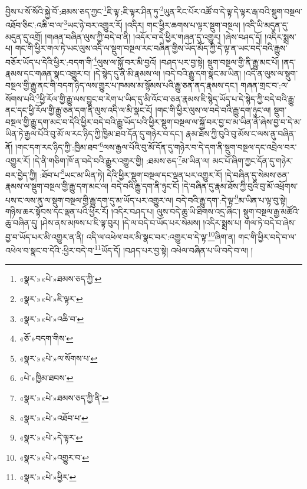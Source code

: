 བྱིས་པ་སོ་སོའི་སྐྱེ་བོ་:ཐམས་ཅད་ཀྱང་\footnote{«སྣར་»«པེ་»ཐམས་ཅད་ཀྱི་}ཇི་ལྟ་:ཇི་ལྟར་ཤིན་ཏུ་\footnote{«སྣར་»«པེ་»ཇི་ལྟར་}ཡུན་རིང་པོར་འཚོ་བ་དེ་ལྟ་དེ་ལྟར་རྒ་བའི་སྡུག་བསྔལ་འཐོབ་ཅིང་:འཆི་བ་ལ་\footnote{«སྣར་»«པེ་»འཆི་བ་}ཡང་ཉེ་བར་འགྱུར་རོ། །འདིར། གང་ཕྱིར་ཆགས་པ་ལྟར་སྡུག་བསྔལ། །འདི་ཡི་མདུན་དུ་མདུན་དུ་འགྲོ། །གཞན་བཞིན་ལུས་ཀྱི་བདེ་བ་ནི། །འདོར་བ་དེ་ཕྱིར་གཞན་དུ་འགྱུར། །ཞེས་བཤད་དོ། །འདིར་སྨྲས་པ། གང་གི་ཕྱིར་གལ་ཏེ་ཡང་ལུས་འདི་ལ་སྡུག་བསྔལ་རང་བཞིན་གྱིས་ཡོད་མོད་ཀྱི་དེ་ལྟ་ན་ཡང་བདེ་བའི་རྒྱུས་བཅོར་ཡོད་པ་དེའི་ཕྱིར་:བདག་གི་\footnote{«ཅོ་»བདག་གིས་}ལུས་ལ་སྐྱོ་བར་མི་བྱའོ། །བཤད་པར་བྱ་སྟེ། སྡུག་བསྔལ་གྱི་ནི་རྒྱུ་མང་པོ། །ནད་རྣམས་དང་གཞན་སྣང་འགྱུར་བ། །དེ་སྙེད་དུ་ནི་མི་རྣམས་ལ། །བདེ་བའི་རྒྱུ་དག་སྣང་མ་ཡིན། །འདི་ན་ལུས་ལ་སྡུག་བསྔལ་གྱི་རྒྱུ་ནང་གི་བདག་ཉིད་ལས་གྱུར་པ་ཁམས་མ་སྙོམས་པའི་རྒྱུ་ཅན་ནད་རྣམས་དང་། གཞན་གྲང་བ་:ལ་སོགས་པའི་\footnote{«སྣར་»«པེ་»ལ་སོགས་པ་}ཕྱི་རོལ་གྱི་རྒྱུ་ལས་བྱུང་བ་རེག་པ་ཡིད་དུ་མི་འོང་བ་ཅན་རྣམས་ཇི་སྙེད་ཡོད་པ་དེ་སྙེད་ཀྱི་བདེ་བའི་རྒྱུ་ནང་དང་ཕྱི་རོལ་གྱི་རྒྱུ་ཅན་དག་ནི་ལུས་འདི་ལ་མི་སྣང་ངོ། །གང་གི་ཕྱིར་ལུས་ལ་བདེ་བའི་རྒྱུ་དག་ཉུང་ལ། སྡུག་བསྔལ་གྱི་རྒྱུ་དག་མང་བ་དེའི་ཕྱིར་བདེ་བའི་རྒྱུ་ཡོད་པའི་ཕྱིར་སྡུག་བསྔལ་ལ་སྐྱོ་བར་བྱ་བ་མ་ཡིན་ནོ་ཞེས་བྱ་བ་དེ་མ་ཡིན་ཏེ་རྒྱལ་པོའི་བུ་མོ་ལ་རང་ཉིད་ཀྱི་ཁྱིམ་ཐབ་དོན་དུ་གཉེར་བ་དང་། རྣམ་ཐོས་ཀྱི་བུའི་བུ་མོས་ང་ལས་ནུ་བཞིན་ནོ། །གང་དག་རང་ཉིད་ཀྱི་:ཁྱིམ་ཐབ་\footnote{«པེ་»ཁྱིམ་ཐབས་}ལས་རྒྱལ་པོའི་བུ་མོ་དོན་དུ་གཉེར་བ་དེ་དག་ནི་སྡུག་བསྔལ་དང་འབྲེལ་བར་འགྱུར་རོ། །དེ་ནི་གཅིག་ཁོ་ན་བདེ་བའི་རྒྱུར་འགྱུར་གྱི། :ཐམས་ཅད་\footnote{«སྣར་»«པེ་»ཐམས་ཅད་ཀྱི་ནི་}མ་ཡིན་ལ། མང་པོ་ཞིག་ཀྱང་དོན་དུ་གཉེར་བར་བྱེད་ཀྱི། :ཐོབ་པ་\footnote{«སྣར་»«པེ་»འཐོབ་པ་}ཡང་མ་ཡིན་ཏེ། དེའི་ཕྱིར་སྡུག་བསྔལ་དང་ལྡན་པར་འགྱུར་རོ། །དེ་བཞིན་དུ་སེམས་ཅན་རྣམས་ལ་སྡུག་བསྔལ་གྱི་རྒྱུ་དག་མང་ལ། བདེ་བའི་རྒྱུ་དག་ནི་ཉུང་ངོ། །དེ་བཞིན་དུ་རྣམ་ཐོས་ཀྱི་བུའི་བུ་མོ་འཕྲོགས་པས་ང་ལས་ནུ་ལ་སྡུག་བསྔལ་གྱི་རྒྱུ་དག་དུ་མ་ཡོད་པར་འགྱུར་ལ། བདེ་བའི་རྒྱུ་དག་:དེ་ལྟ་\footnote{«སྣར་»«པེ་»དེ་ལྟར་}མ་ཡིན་པ་ལྟ་བུ་སྟེ། གཉིས་ཆར་སྟོབས་དང་ལྡན་པའི་ཕྱིར་རོ། །འདིར་བཤད་པ། ལུས་བདེ་ཆུ་ཡི་ཐིགས་འདྲ་ཞིང་། སྡུག་བསྔལ་རྒྱ་མཚོའི་ཆུ་བཞིན་དུ། །ཤེས་ནས་མཁས་པ་ཇི་ལྟ་བུར། །དེ་ལ་བདེ་བ་ཡོད་པར་སེམས། །འདིར་སྨྲས་པ། གལ་ཏེ་བདེ་བ་ཞེས་བྱ་བ་ཡོད་པར་མི་འགྱུར་ན་ནི། འདི་ལ་འཕེལ་བར་མི་སྣང་བར་:འགྱུར་བ་དེ་ལྟ་\footnote{«སྣར་»«པེ་»འགྱུར་བ་}ཞིག་ན། གང་གི་ཕྱིར་བདེ་བ་ལ་འཕེལ་བ་སྣང་བ་དེའི་:ཕྱིར་བདེ་བ་\footnote{«སྣར་»«པེ་»ཕྱིར་}ཡོད་དོ། །བཤད་པར་བྱ་སྟེ། འཕེལ་བཞིན་པ་ཡི་བདེ་བ་ལ། །
